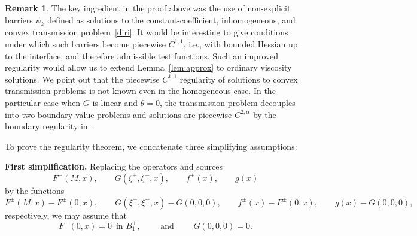 \documentclass[letter,11pt]{amsart}
\theoremstyle{definition}
\newtheorem{rem}[thm]{Remark}
\numberwithin{equation}{section}
\begin{document}
\begin{rem}
\label{rem:convex}
The key ingredient in the proof above was the use of non-explicit barriers $\psi_k$ defined as solutions to the constant-coefficient, inhomogeneous, and convex transmission problem~\eqref{diri}.
It would be interesting to give conditions under which such barriers become piecewise $C^{1,1}$, i.e., with bounded Hessian up to the interface, and therefore admissible test functions.
Such an improved regularity would allow us to extend Lemma~\ref{lem:approx} to ordinary viscosity solutions.
We point out that the piecewise $C^{1,1}$ regularity of solutions to convex transmission problems is not known even in the homogeneous case.
In the particular case when $G$ is linear and $\theta = 0$, the transmission problem decouples into two boundary-value problems and solutions are piecewise $C^{2,\alpha}$ by the boundary regularity in~\cite{LZ,MS}.
\end{rem}

\medskip

To prove the regularity theorem, we concatenate three simplifying assumptions:

\medskip

\noindent\textbf{First simplification.}
\noindent
Replacing the operators and sources
\[
F^{\pm}(M,x), \qquad G(\xi^{+},\xi^{-},x), \qquad f^{\pm}(x), \qquad g(x)
\]
by the functions
\[
F^{\pm}(M, x) - F^{\pm}(0,x), \qquad G(\xi^{+}, \xi^{-}, x) - G(0,0,0), \qquad f^{\pm}(x) - F^{\pm}(0,x), \qquad g(x) - G(0,0,0),
\]
respectively, we may assume that 
\begin{equation}
\label{simp1}
F^{\pm}(0, x) = 0 \, \text{ in } B_1^{\pm}, \qquad \text{ and } \qquad G(0,0,0) = 0.
\end{equation}

\medskip
\end{document}
